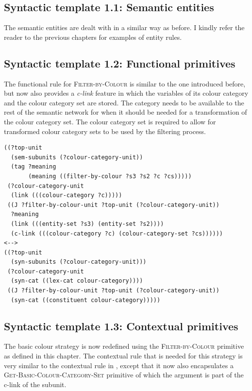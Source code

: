 \subsection{Syntactic template 1.1: Semantic entities}

The semantic entities are dealt with in a similar way as before. I
kindly refer the reader to the previous chapters for examples of
entity rules.

\subsection{Syntactic template 1.2: Functional primitives}

The functional rule for \textsc{Filter-by-Colour} is similar to the
one introduced before, but now also provides a \emph{c-link} feature
in which the variables of its colour category and the colour category
set are stored. The category needs to be available to the rest of the
semantic network for when it should be needed for a transformation of
the colour category set. The colour category set is required to allow
for transformed colour category sets to be used by the filtering
process.

\footnotesize
{}
\begin{lstlisting}
((?top-unit
  (sem-subunits (?colour-category-unit)) 
  (tag ?meaning
       (meaning ((filter-by-colour ?s3 ?s2 ?c ?cs)))))
 (?colour-category-unit 
  (link (((colour-category ?c)))))
 ((J ?filter-by-colour-unit ?top-unit (?colour-category-unit))
  ?meaning
  (link (((entity-set ?s3) (entity-set ?s2))))
  (c-link (((colour-category ?c) (colour-category-set ?cs))))))
<-->
((?top-unit 
  (syn-subunits (?colour-category-unit)))
 (?colour-category-unit 
  (syn-cat ((lex-cat colour-category))))
 ((J ?filter-by-colour-unit ?top-unit (?colour-category-unit))
  (syn-cat ((constituent colour-category)))))
\end{lstlisting}
\normalsize

\subsection{Syntactic template 1.3: Contextual primitives}

The basic colour strategy is now redefined 
using the \textsc{Filter-by-Colour} primitive as defined in this
chapter. The contextual rule that is needed for this strategy
is very similar to the contextual rule in , except that it now also encapsulates
a \textsc{Get-Basic-Colour-Category-Set} primitive of which the argument is part of
the c-link of the subunit.

